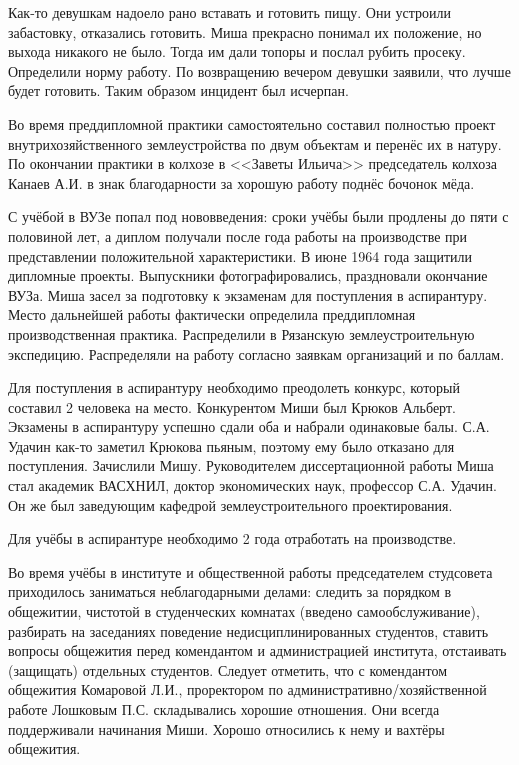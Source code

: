 Как-то девушкам надоело рано вставать и готовить пищу. Они устроили забастовку, отказались готовить. Миша прекрасно понимал их положение, но выхода никакого не было. Тогда им дали топоры и послал рубить просеку. Определили норму работу. По возвращению вечером девушки заявили, что лучше будет готовить. Таким образом инцидент был исчерпан. 

Во время преддипломной практики самостоятельно составил полностью проект внутрихозяйственного землеустройства по двум объектам и перенёс их в натуру. По окончании практики в колхозе в <<Заветы Ильича>> председатель колхоза Канаев А.И. в знак благодарности за хорошую работу поднёс бочонок мёда.

С учёбой в ВУЗе попал под нововведения: сроки учёбы были продлены до пяти с половиной лет, а диплом получали после года работы на производстве при представлении положительной характеристики. В июне 1964 года защитили дипломные проекты. Выпускники фотографировались, праздновали окончание ВУЗа. Миша засел за подготовку к экзаменам для поступления в аспирантуру. Место дальнейшей работы фактически определила преддипломная производственная практика. Распределили в Рязанскую землеустроительную экспедицию. Распределяли на работу согласно заявкам организаций и по баллам.

Для поступления в аспирантуру необходимо преодолеть конкурс, который составил 2 человека на место. Конкурентом Миши был Крюков Альберт. Экзамены в аспирантуру успешно сдали оба и набрали одинаковые балы. С.А. Удачин как-то заметил Крюкова пьяным, поэтому ему было отказано для поступления. Зачислили Мишу. Руководителем диссертационной работы Миша стал академик ВАСХНИЛ, доктор экономических наук, профессор С.А. Удачин. Он же был заведующим кафедрой землеустроительного проектирования.

Для учёбы в аспирантуре необходимо 2 года отработать на производстве.

Во время учёбы в институте и общественной работы председателем студсовета приходилось заниматься неблагодарными делами: следить за порядком в общежитии, чистотой в студенческих комнатах (введено самообслуживание), разбирать на заседаниях поведение недисциплинированных студентов, ставить вопросы общежития перед комендантом и администрацией института, отстаивать (защищать) отдельных студентов. Следует отметить, что с комендантом общежития Комаровой Л.И., проректором по административно\-/хозяйственной работе Лошковым П.С. складывались хорошие отношения. Они всегда поддерживали начинания Миши. Хорошо относились к нему и вахтёры общежития.

